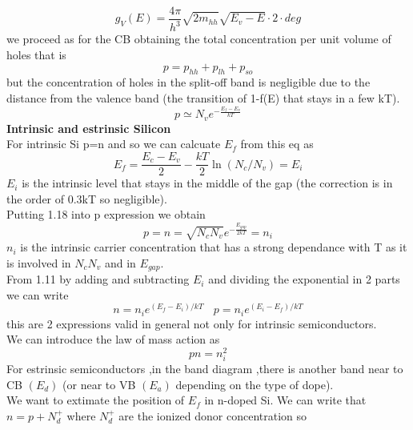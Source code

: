 \begin{equation}
g_V(E)=\frac{4\pi}{h^3}\sqrt{2m_{hh}}\sqrt{E_v-E}\cdot 2 \cdot deg
\end{equation}
we proceed as for the CB obtaining the total concentration per unit volume of holes that is 
\begin{equation}
p=p_{hh}+p_{lh}+p_{so}
\end{equation}
but the concentration of holes in the split-off band is negligible due to the distance from the valence band (the transition of 1-f(E) that stays in a few kT).\\
\begin{equation}
p\simeq N_v e^{-\frac{E_f-E_v}{kT}}
\end{equation}
\newline
{\bf Intrinsic and estrinsic Silicon}\\
For intrinsic Si p=n and so we can calcuate $E_f$ from this eq as
\begin{equation}
E_f=\frac{E_c-E_v}{2}-\frac{kT}{2}\ln(N_c/N_v)=E_i 
\end{equation}
$E_i$ is the intrinsic level that stays in the middle of the gap (the correction is in the order of 0.3kT so negligible).\\
Putting 1.18 into p expression we obtain
\begin{equation}
p=n=\sqrt{N_cN_v}e^{-\frac{E_{gap}}{2kT}}=n_i
\end{equation}
$n_i$ is the intrinsic carrier concentration that has a strong dependance with T as it is involved in $N_c N_v$ and in $E_{gap}$.\\
From 1.11 by adding and subtracting $E_i$ and dividing the exponential in 2 parts we can write 
\begin{equation}
n=n_ie^{(E_f-E_i)/kT}\ \ \ \ p=n_ie^{(E_i-E_f)/kT}
\end{equation}
this are 2 expressions valid in general not only for intrinsic semiconductors.\\
We can introduce the law of mass action as 
\begin{equation}
pn=n_i^2
\end{equation}
For estrinsic semiconductors ,in the band diagram ,there is another band near to CB $(E_d)$ (or near to VB $(E_a)$ depending on the type of dope).\\
We want to extimate the position of $E_f$ in n-doped Si. We can write that $n=p+N_d^+$ where $N_d^+$ are the ionized donor concentration so
